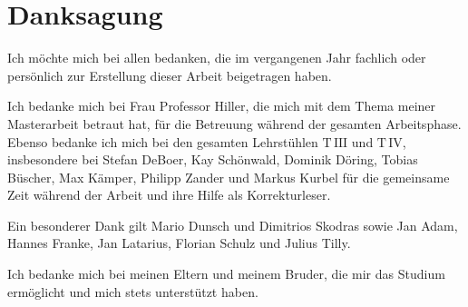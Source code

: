 \cleardoublepage
\section*{Danksagung}

Ich möchte mich bei allen bedanken, die im vergangenen Jahr fachlich oder 
persönlich zur Erstellung dieser Arbeit beigetragen haben.

Ich bedanke mich bei Frau Professor Hiller, die mich mit dem 
Thema meiner Masterarbeit betraut hat, für die Betreuung 
während der gesamten Arbeitsphase. Ebenso bedanke ich mich bei den gesamten 
Lehrstühlen $\text{T}\,\text{III}$ und $\text{T}\,\text{IV}$, insbesondere bei 
Stefan DeBoer, 
Kay Schönwald, Dominik Döring, Tobias Büscher, Max Kämper, Philipp Zander und 
Markus Kurbel für die gemeinsame Zeit während der Arbeit und ihre Hilfe 
als Korrekturleser. 

Ein besonderer Dank 
gilt Mario Dunsch und Dimitrios Skodras sowie 
Jan Adam, Hannes Franke, Jan Latarius, Florian Schulz und Julius Tilly.  

Ich bedanke mich bei meinen Eltern und meinem Bruder, die mir das Studium 
ermöglicht und mich stets unterstützt haben.
